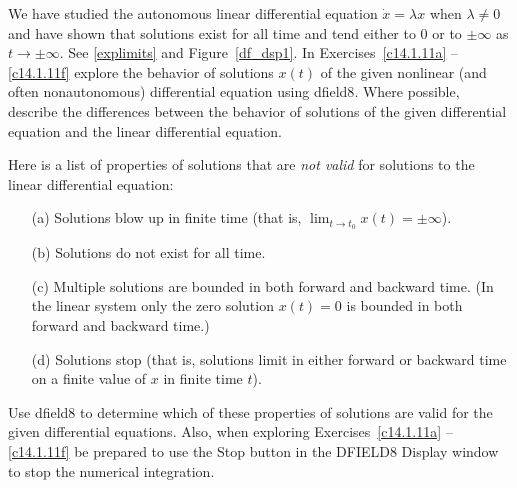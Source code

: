 \documentclass{ximera}
\begin{document}
\CEXER

\noindent We have studied the autonomous linear differential equation 
$\dot{x}=\lambda x$ when $\lambda\neq 0$ and have shown that solutions 
exist for all time and tend either to $0$ or to $\pm\infty$ as $t\to\pm\infty$.
See \eqref{explimits} and Figure~\ref{df_dsp1}.  In Exercises~\ref{c14.1.11a} -- 
\ref{c14.1.11f} explore the behavior of solutions $x(t)$ of the given 
nonlinear (and often nonautonomous) differential equation using {\sf dfield8}.  
Where possible, describe the differences between the behavior of solutions of 
the given differential equation and the linear differential equation.  

  Here is a list of properties of solutions that are 
{\em not valid\/} for solutions to the linear differential equation:
\begin{itemize}
\item[(a)]  Solutions blow up in finite time (that is, 
$\lim_{t\to t_0}x(t)=\pm\infty$).
\item[(b)]  Solutions do not exist for all time.
\item[(c)]  Multiple solutions are bounded in both forward and backward time.
(In the linear system only the zero solution $x(t)=0$ is bounded in both 
forward and backward time.)
\item[(d)]  Solutions stop (that is, solutions limit in either forward or 
backward time on a finite value of $x$ in finite time $t$).
\end{itemize}
Use {\sf dfield8} to determine which of these properties of solutions are 
valid for the given differential equations.  Also, when exploring 
Exercises~\ref{c14.1.11a} -- \ref{c14.1.11f} be prepared to use the {\sf Stop}
button in the {\sf DFIELD8 Display} window to stop the numerical integration. 
\end{document}
